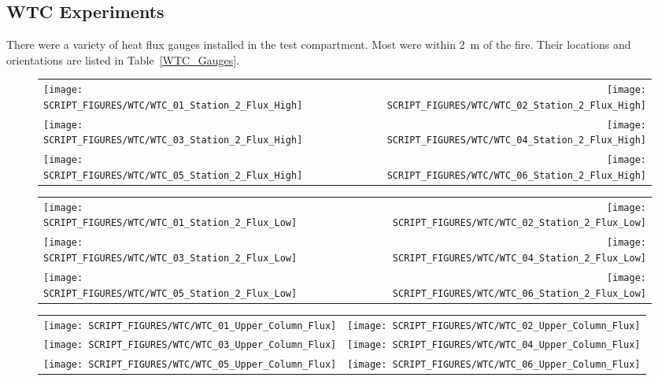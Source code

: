 \clearpage

\subsection{WTC Experiments}

There were a variety of heat flux gauges installed in the test compartment. Most were within 2~m of the fire. Their locations and orientations are listed in Table~\ref{WTC_Gauges}.


\begin{figure}[h!]
\begin{tabular*}{\textwidth}{l@{\extracolsep{\fill}}r}
\texttt{[image: SCRIPT\_FIGURES/WTC/WTC\_01\_Station\_2\_Flux\_High]} &
\texttt{[image: SCRIPT\_FIGURES/WTC/WTC\_02\_Station\_2\_Flux\_High]} \\
\texttt{[image: SCRIPT\_FIGURES/WTC/WTC\_03\_Station\_2\_Flux\_High]} &
\texttt{[image: SCRIPT\_FIGURES/WTC/WTC\_04\_Station\_2\_Flux\_High]} \\
\texttt{[image: SCRIPT\_FIGURES/WTC/WTC\_05\_Station\_2\_Flux\_High]} &
\texttt{[image: SCRIPT\_FIGURES/WTC/WTC\_06\_Station\_2\_Flux\_High]}
\end{tabular*}
\label{NIST_WTC_Station_2_Flux_High}
\end{figure}

\newpage

\begin{figure}[p]
\begin{tabular*}{\textwidth}{l@{\extracolsep{\fill}}r}
\texttt{[image: SCRIPT\_FIGURES/WTC/WTC\_01\_Station\_2\_Flux\_Low]} &
\texttt{[image: SCRIPT\_FIGURES/WTC/WTC\_02\_Station\_2\_Flux\_Low]} \\
\texttt{[image: SCRIPT\_FIGURES/WTC/WTC\_03\_Station\_2\_Flux\_Low]} &
\texttt{[image: SCRIPT\_FIGURES/WTC/WTC\_04\_Station\_2\_Flux\_Low]} \\
\texttt{[image: SCRIPT\_FIGURES/WTC/WTC\_05\_Station\_2\_Flux\_Low]} &
\texttt{[image: SCRIPT\_FIGURES/WTC/WTC\_06\_Station\_2\_Flux\_Low]}
\end{tabular*}
\label{NIST_WTC_Station_2_Flux_Low}
\end{figure}

\begin{figure}[p]
\begin{tabular*}{\textwidth}{l@{\extracolsep{\fill}}r}
\texttt{[image: SCRIPT\_FIGURES/WTC/WTC\_01\_Upper\_Column\_Flux]} &
\texttt{[image: SCRIPT\_FIGURES/WTC/WTC\_02\_Upper\_Column\_Flux]} \\
\texttt{[image: SCRIPT\_FIGURES/WTC/WTC\_03\_Upper\_Column\_Flux]} &
\texttt{[image: SCRIPT\_FIGURES/WTC/WTC\_04\_Upper\_Column\_Flux]} \\
\texttt{[image: SCRIPT\_FIGURES/WTC/WTC\_05\_Upper\_Column\_Flux]} &
\texttt{[image: SCRIPT\_FIGURES/WTC/WTC\_06\_Upper\_Column\_Flux]}
\end{tabular*}
\label{NIST_WTC_Upper_Column_Flux}
\end{figure}

